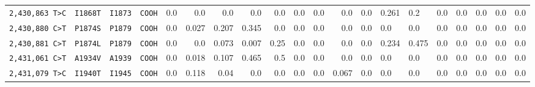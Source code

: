 \begin{tabular}{llllrrrrrrrrr}
\texttt{2,430,863 T>C} & \texttt{I1868T} & \texttt{I1873} & \texttt{COOH} & 0.0 & 0.0 & 0.0 & 0.0 & 0.0 & 0.0 & 0.0 & 0.0 & 0.0 & 0.261 & 0.2 & 0.0 & 0.0 & 0.0 & 0.0 & 0.0 \\

\texttt{2,430,880 C>T} & \texttt{P1874S} & \texttt{P1879} & \texttt{COOH} & 0.0 & 0.027 & 0.207 & 0.345 & 0.0 & 0.0 & 0.0 & 0.0 & 0.0 & 0.0 & 0.0 & 0.0 & 0.0 & 0.0 & 0.0 & 0.0 \\

\texttt{2,430,881 C>T} & \texttt{P1874L} & \texttt{P1879} & \texttt{COOH} & 0.0 & 0.0 & 0.073 & 0.007 & 0.25 & 0.0 & 0.0 & 0.0 & 0.0 & 0.234 & 0.475 & 0.0 & 0.0 & 0.0 & 0.0 & 0.0 \\

\texttt{2,431,061 C>T} & \texttt{A1934V} & \texttt{A1939} & \texttt{COOH} & 0.0 & 0.018 & 0.107 & 0.465 & 0.5 & 0.0 & 0.0 & 0.0 & 0.0 & 0.0 & 0.0 & 0.0 & 0.0 & 0.0 & 0.0 & 0.0 \\

\texttt{2,431,079 T>C} & \texttt{I1940T} & \texttt{I1945} & \texttt{COOH} & 0.0 & 0.118 & 0.04 & 0.0 & 0.0 & 0.0 & 0.0 & 0.067 & 0.0 & 0.0 & 0.0 & 0.0 & 0.0 & 0.0 & 0.0 & 0.0 \\

\bottomrule
\end{tabular}
